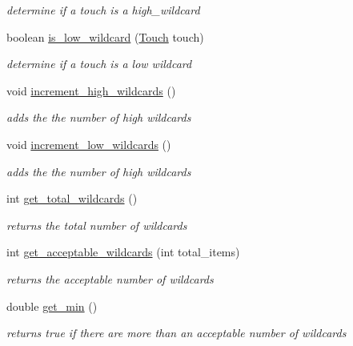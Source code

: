 \begin{DoxyCompactItemize}
\begin{DoxyCompactList}\small\item\em determine if a touch is a high\+\_\+wildcard \end{DoxyCompactList}\item 
boolean \hyperlink{classcomponents_1_1_token_a5e1eeb68449d6a940302f6b2561c6cec}{is\+\_\+low\+\_\+wildcard} (\hyperlink{classcomponents_1_1_touch}{Touch} touch)
\begin{DoxyCompactList}\small\item\em determine if a touch is a low wildcard \end{DoxyCompactList}\item 
void \hyperlink{classcomponents_1_1_token_adb18305be1ee0eb86e7a27b59d62a3ab}{increment\+\_\+high\+\_\+wildcards} ()
\begin{DoxyCompactList}\small\item\em adds the the number of high wildcards \end{DoxyCompactList}\item 
void \hyperlink{classcomponents_1_1_token_aedf81a3bafbf9843754192a5f287a06d}{increment\+\_\+low\+\_\+wildcards} ()
\begin{DoxyCompactList}\small\item\em adds the the number of high wildcards \end{DoxyCompactList}\item 
int \hyperlink{classcomponents_1_1_token_a08348f7ec1a53d80f8886cca07e70e97}{get\+\_\+total\+\_\+wildcards} ()
\begin{DoxyCompactList}\small\item\em returns the total number of wildcards \end{DoxyCompactList}\item 
int \hyperlink{classcomponents_1_1_token_a1f4fc1f480c23dcd8bc00a43b34ed613}{get\+\_\+acceptable\+\_\+wildcards} (int total\+\_\+items)
\begin{DoxyCompactList}\small\item\em returns the acceptable number of wildcards \end{DoxyCompactList}\item 
double \hyperlink{classcomponents_1_1_token_a7139374ae5d36699d9d0b2e80d9afde7}{get\+\_\+min} ()
\begin{DoxyCompactList}\small\item\em returns true if there are more than an acceptable number of wildcards \end{DoxyCompactList}\item 

\end{DoxyCompactItemize}
